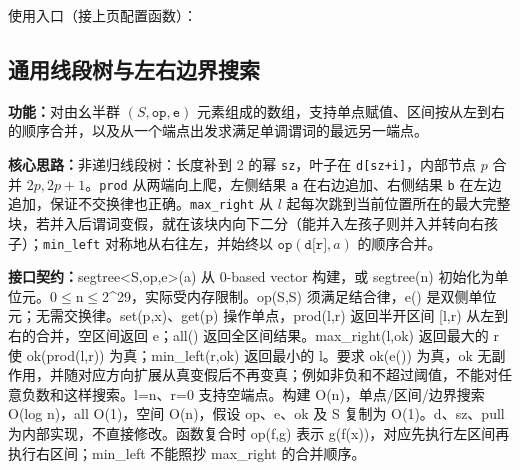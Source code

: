 

\newpage

\noindent 使用入口（接上页配置函数）：



\subsection{通用线段树与左右边界搜索}\label{compact-segtree}

\noindent\textbf{功能：}\allowbreak 对由幺半群 $(S,\texttt{op},\texttt{e})$ 元素组成的数组，支持单点赋值、区间按从左到右的顺序合并，以及从一个端点出发求满足单调谓词的最远另一端点。

\textbf{核心思路：}\allowbreak 非递归线段树：长度补到 2 的幂 \texttt{sz}，叶子在 \texttt{d[sz+i]}，内部节点 $p$ 合并 $2p,2p+1$。\texttt{prod} 从两端向上爬，左侧结果 \texttt{a} 在右边追加、右侧结果 \texttt{b} 在左边追加，保证不交换律也正确。\texttt{max\_right} 从 $l$ 起每次跳到当前位置所在的最大完整块，若并入后谓词变假，就在该块内向下二分（能并入左孩子则并入并转向右孩子）；\texttt{min\_left} 对称地从右往左，并始终以 $\texttt{op}(\texttt{d[r]},a)$ 的顺序合并。



{\sloppy{}\noindent\textbf{接口契约：}segtree<S,op,e>(a) 从 0-based vector 构建，或 segtree(n) 初始化为单位元。0$\le$n$\le$2\textasciicircum{}29，实际受内存限制。op(S,S) 须满足结合律，e() 是双侧单位元；无需交换律。set(p,x)、get(p) 操作单点，prod(l,r) 返回半开区间 [l,r) 从左到右的合并，空区间返回 e；all() 返回全区间结果。max\_right(l,ok) 返回最大的 r 使 ok(prod(l,r)) 为真；min\_left(r,ok) 返回最小的 l。要求 ok(e()) 为真，ok 无副作用，并随对应方向扩展从真变假后不再变真；例如非负和不超过阈值，不能对任意负数和这样搜索。l=n、r=0 支持空端点。构建 O(n)，单点/区间/边界搜索 O(log n)，all O(1)，空间 O(n)，假设 op、e、ok 及 S 复制为 O(1)。d、sz、pull 为内部实现，不直接修改。函数复合时 op(f,g) 表示 g(f(x))，对应先执行左区间再执行右区间；min\_left 不能照抄 max\_right 的合并顺序。\par}

\Needspace{453pt}



\newpage



